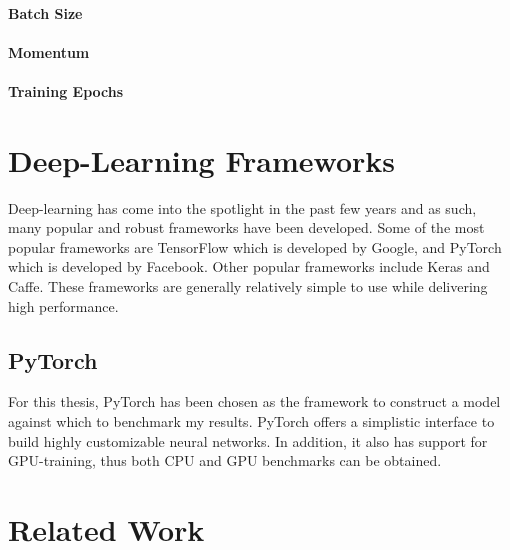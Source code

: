 \paragraph{Batch Size}
\paragraph{Momentum}
\paragraph{Training Epochs}


\section{Deep-Learning Frameworks}
Deep-learning has come into the spotlight in the past few years and as such, many popular and robust frameworks have been developed. Some of the most popular frameworks are TensorFlow which is developed by Google, and PyTorch which is developed by Facebook. Other popular frameworks include Keras and Caffe. These frameworks are generally relatively simple to use while delivering high performance. 


\subsection{PyTorch}
For this thesis, PyTorch has been chosen as the framework to construct a model against which to benchmark my results. PyTorch offers a simplistic interface to build highly customizable neural networks. In addition, it also has support for GPU-training, thus both CPU and GPU benchmarks can be obtained.

\section{Related Work}